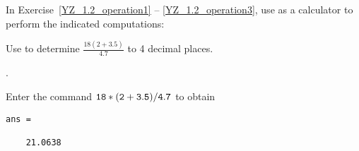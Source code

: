 \documentclass{ximera}
\begin{document}
In Exercise~\ref{YZ_1.2_operation1} -- \ref{YZ_1.2_operation3}, use \Matlab as a calculator to perform the indicated computations:

\begin{computerExercise} \label{YZ_1.2_operation1}
Use \Matlab to determine $\frac{18 (2+3.5)}{4.7}$ to 4 decimal places.

\begin{solution}
.

\soln
Enter the \Matlab command ${\tt 18 * (2 + 3.5)/4.7}$ to obtain
\begin{verbatim}
ans =

    21.0638
\end{verbatim}
\end{solution}
\end{computerExercise}
\end{document}
